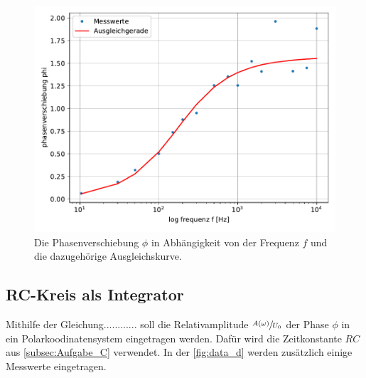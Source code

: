 \begin{figure}
  \centering
  \includegraphics{content/data_c_ausgleich.pdf}
  \caption{Die Phasenverschiebung $\phi$ in Abhängigkeit von der Frequenz $f$ und die dazugehörige Ausgleichskurve.}
  \label{fig:data_c}
\end{figure}

\subsection{RC-Kreis als Integrator}
\label{Aufgabe_d}
Mithilfe der Gleichung............ soll die Relativamplitude $\sfrac{A(\omega)}{U_0}$ der Phase $\phi$ in ein Polarkoodinatensystem eingetragen werden.
Dafür wird die Zeitkonstante $RC$ aus \autoref{subsec:Aufgabe_C} verwendet.
In der \autoref{fig:data_d} werden zusätzlich einige Messwerte eingetragen.

